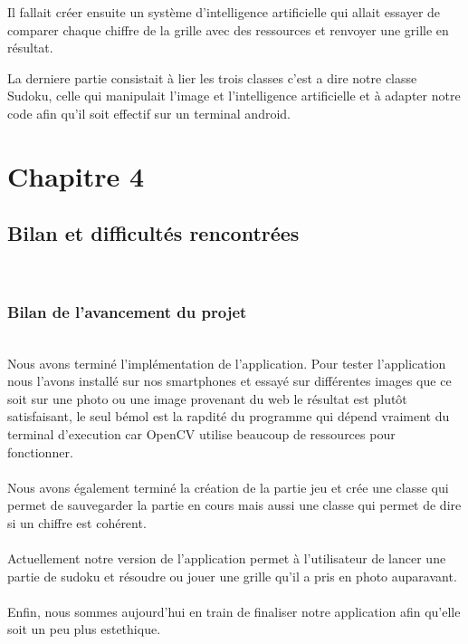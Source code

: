 \documentclass{article}
\begin{document}
Il fallait créer ensuite un système d'intelligence artificielle qui  allait essayer de comparer chaque chiffre de la grille avec des ressources et renvoyer une grille en résultat.

La derniere partie consistait à lier les trois classes c'est a dire notre classe Sudoku, celle qui manipulait l'image et l'intelligence artificielle et à adapter notre code afin qu'il soit effectif sur un terminal android.





\newpage
\chapter{\LARGE{\textbf{Chapitre 4}}}
\section{Bilan et difficultés rencontrées}~\\

\subsection{Bilan de l'avancement du projet}~\\
Nous avons terminé l'implémentation de l'application. Pour tester l'application nous l'avons installé sur nos smartphones et essayé sur différentes images que ce soit sur une photo ou une image provenant du web le résultat est plutôt satisfaisant, le seul bémol est la rapdité du programme qui dépend vraiment du terminal d'execution car OpenCV utilise beaucoup de ressources pour fonctionner.\\\\
Nous avons également terminé la création de la partie jeu et crée une classe qui permet de sauvegarder la partie en cours mais aussi une classe qui permet de dire si un chiffre est cohérent.\\\\
Actuellement notre version de l'application permet à l'utilisateur de lancer une partie de sudoku et résoudre ou jouer une grille qu'il a pris en photo auparavant.\\\\
Enfin, nous sommes aujourd'hui en train de finaliser notre application afin qu'elle soit un peu plus estethique.
\end{document}
